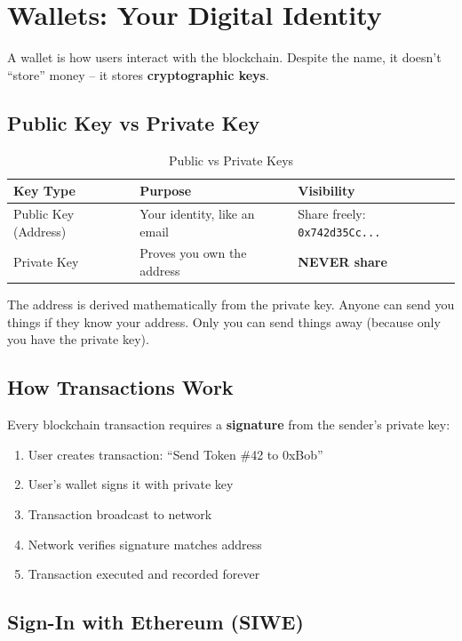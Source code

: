\documentclass[11pt,a4paper]{article}
\newcommand{\keyword}[1]{\textbf{\textcolor{accentcolor}{#1}}}
\newcommand{\code}[1]{\texttt{#1}}
\begin{document}
\newpage
\section{Wallets: Your Digital Identity}

A wallet is how users interact with the blockchain. Despite the name, it doesn't ``store'' money -- it stores \keyword{cryptographic keys}.

\subsection{Public Key vs Private Key}

\begin{table}[h]
\centering
\begin{tabular}{@{}lll@{}}
\toprule
\textbf{Key Type} & \textbf{Purpose} & \textbf{Visibility} \\
\midrule
Public Key (Address) & Your identity, like an email & Share freely: \code{0x742d35Cc...} \\
Private Key & Proves you own the address & \textbf{NEVER share} \\
\bottomrule
\end{tabular}
\caption{Public vs Private Keys}
\end{table}

The address is derived mathematically from the private key. Anyone can send you things if they know your address. Only you can send things away (because only you have the private key).

\subsection{How Transactions Work}

Every blockchain transaction requires a \textbf{signature} from the sender's private key:

\begin{enumerate}
    \item User creates transaction: ``Send Token \#42 to 0xBob''
    \item User's wallet signs it with private key
    \item Transaction broadcast to network
    \item Network verifies signature matches address
    \item Transaction executed and recorded forever
\end{enumerate}

\subsection{Sign-In with Ethereum (SIWE)}
\end{document}
